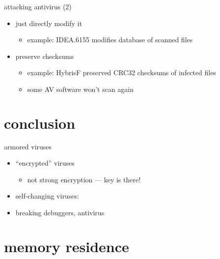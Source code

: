 \begin{frame}{attacking antivirus (2)}
    \begin{itemize}
    \item just directly modify it
        \begin{itemize}
        \item example: IDEA.6155 modifies database of scanned files
        \end{itemize}
    \item preserve checksums
        \begin{itemize}
        \item example: HybrisF preserved CRC32 checksums of infected files
        \item some AV software won't scan again
        \end{itemize}
    \end{itemize}
\end{frame}

\section{conclusion}


\begin{frame}{armored viruses}
    \begin{itemize}
    \item ``encrypted'' viruses
        \begin{itemize}
        \item not strong encryption --- key is there!
        \end{itemize}
    \item self-changing viruses:
    \item breaking debuggers, antivirus
    \end{itemize}
\end{frame}


\section{memory residence}

